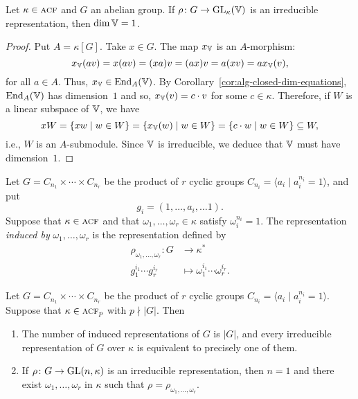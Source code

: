 \begin{prop}\label{prop:commutative-group-alg-closed-field}
    Let\/ $\kappa\in\operatorname{\textnormal{\textsc{acf}}}$ and\/ $G$ an abelian group. If\/ $\rho\colon G\to{\rm GL}_\kappa(\mathbb V)$ is an irreducible representation, then\/ $\dim\mathbb V=1$.
\end{prop}

\begin{proof}
    Put $A=\kappa[G]$. Take $x\in G$. The map $x_\mathbb V$ is an $A$-morphism:
    $$
        x_\mathbb V(av) = x(av) = (xa)v = (ax)v = a(xv) = ax_\mathbb V(v),
    $$
    for all $a\in A$. Thus, $x_\mathbb V\in {\operatorname{End}}_A(\mathbb V)$. By Corollary~\ref{cor:alg-closed-dim-equations}, ${\operatorname{End}}_A(\mathbb V)$ has dimension~$1$ and so, $x_\mathbb V(v)=c\cdot v$ for some $c\in\kappa$. Therefore, if $W$ is a linear subspace of $\mathbb V$, we have
    $$
        xW = \{xw\mid w\in W\} = \{x_\mathbb V(w)\mid w\in W\}
            = \{c\cdot w\mid w\in W\}\subseteq W,
    $$
    i.e., $W$ is an $A$-submodule. Since $\mathbb V$ is irreducible, we deduce that $\mathbb V$ must have dimension~$1$.
    
\end{proof}

\begin{defn}
    Let $G=C_{n_1}\times\cdots\times C_{n_r}$ be the product of $r$ cyclic groups $C_{n_i}=\langle a_i\mid a_i^{n_i}=1\rangle$, and put
    $$
        g_i = (1,\dots,a_i,\dots1).
    $$
    Suppose that $\kappa\in\operatorname{\textnormal{\textsc{acf}}}$ and that $\omega_1,\dots,\omega_r\in\kappa$ satisfy $\omega_i^{n_i}=1$. The representation \textsl{induced by\/} $\omega_1,\dots,\omega_r$ is the representation defined by
    \begin{align*}
        \rho_{\omega_1,\dots,\omega_r}\colon G&\to\kappa^*\\
        g_1^{i_1}\cdots g_r^{i_r}
            &\mapsto\omega_1^{i_1}\cdots\omega_r^{i_r}.
    \end{align*}
\end{defn}

\begin{thm}
    Let\/ $G=C_{n_1}\times\cdots\times C_{n_r}$ be the product of\/ $r$ cyclic groups\/ $C_{n_i}=\langle a_i\mid a_i^{n_i}=1\rangle$. Suppose that\/ $\kappa\in\operatorname{\textnormal{\textsc{acf}}}_p$ with $p\nmid|G|$. Then
    \begin{enumerate}[\rm a)]
        \item The number of induced representations of\/ $G$ is\/ $|G|$, and every irreducible representation of\/ $G$ over\/ $\kappa$ is equivalent to precisely one of them.
        
        \item If\/ $\rho\colon G\to\operatorname{GL}(n,\kappa)$ is an irreducible representation, then\/ $n=1$ and there exist\/ $\omega_1,\dots,\omega_r$ in\/ $\kappa$ such that\/ $\rho=\rho_{\omega_1,\dots,\omega_r}$.
    \end{enumerate}    
\end{thm}

